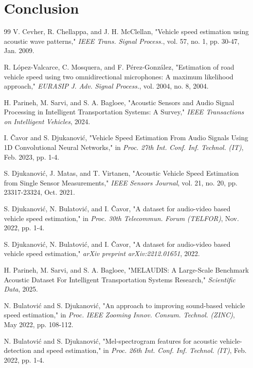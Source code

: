 \documentclass[conference]{IEEEtran}
\begin{document}
\section{Conclusion}

\begin{thebibliography}{99}
V. Cevher, R. Chellappa, and J. H. McClellan, "Vehicle speed estimation using acoustic wave patterns," \textit{IEEE Trans. Signal Process.}, vol. 57, no. 1, pp. 30-47, Jan. 2009.

R. López-Valcarce, C. Mosquera, and F. Pérez-González, "Estimation of road vehicle speed using two omnidirectional microphones: A maximum likelihood approach," \textit{EURASIP J. Adv. Signal Process.}, vol. 2004, no. 8, 2004.

H. Parineh, M. Sarvi, and S. A. Bagloee, "Acoustic Sensors and Audio Signal Processing in Intelligent Transportation Systems: A Survey," \textit{IEEE Transactions on Intelligent Vehicles}, 2024.

I. Čavor and S. Djukanović, "Vehicle Speed Estimation From Audio Signals Using 1D Convolutional Neural Networks," in \textit{Proc. 27th Int. Conf. Inf. Technol. (IT)}, Feb. 2023, pp. 1-4.

S. Djukanović, J. Matas, and T. Virtanen, "Acoustic Vehicle Speed Estimation from Single Sensor Measurements," \textit{IEEE Sensors Journal}, vol. 21, no. 20, pp. 23317-23324, Oct. 2021.

S. Djukanović, N. Bulatović, and I. Čavor, "A dataset for audio-video based vehicle speed estimation," in \textit{Proc. 30th Telecommun. Forum (TELFOR)}, Nov. 2022, pp. 1-4.

S. Djukanović, N. Bulatović, and I. Čavor, "A dataset for audio-video based vehicle speed estimation," \textit{arXiv preprint arXiv:2212.01651}, 2022.

H. Parineh, M. Sarvi, and S. A. Bagloee, "MELAUDIS: A Large-Scale Benchmark Acoustic Dataset For Intelligent Transportation Systems Research," \textit{Scientific Data}, 2025.

N. Bulatović and S. Djukanović, "An approach to improving sound-based vehicle speed estimation," in \textit{Proc. IEEE Zooming Innov. Consum. Technol. (ZINC)}, May 2022, pp. 108-112.

N. Bulatović and S. Djukanović, "Mel-spectrogram features for acoustic vehicle-detection and speed estimation," in \textit{Proc. 26th Int. Conf. Inf. Technol. (IT)}, Feb. 2022, pp. 1-4.


\end{thebibliography}
\end{document}
